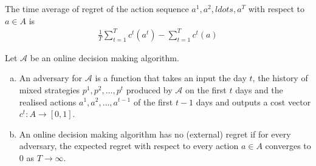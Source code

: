 \begin{defn}
The time average of regret of the action sequence $a^1,a^2,ldots,a^T$ with respect to $a\in A$ is 
\begin{align*}
\frac{1}{T}\sum_{t=1}^{T}c^t(a^t)-\sum_{t=1}^{T}c^t(a)
\end{align*}
\end{defn}

\begin{defn}
Let $\mathcal{A}$ be an online decision making algorithm.
\begin{enumerate}[(a)]
\item An adversary for $\mathcal{A}$ is a function that takes an input the day $t$, the history of mixed strategies $p^1,p^2,\ldots,p^t$ produced by $\mathcal{A}$ on the first $t$ days and the realised actions $a^1,a^2,\ldots, a^{t-1}$ of the first $t-1$ days and outputs a cost vector $c^t:A\to [0,1]$.
\item An online decision making algorithm has no (external) regret if for every adversary, the expected regret with respect to every action $a\in A$ converges to $0$ as $T\to \infty$.
\end{enumerate}
\end{defn}



